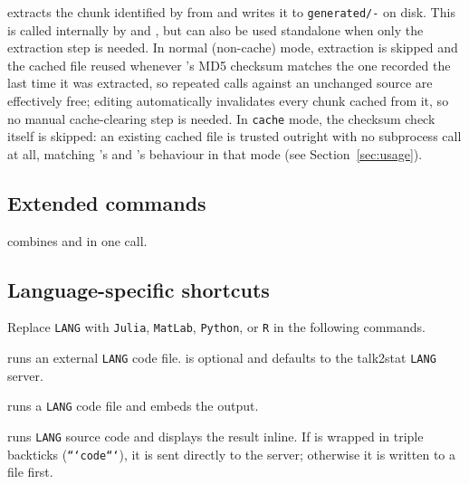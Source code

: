 \documentclass{ltxdoc}
\newcommand{\pkg}[1]{\textsf{#1}}
\newcommand{\opt}[1]{\texttt{#1}}
\newcommand{\file}[1]{\texttt{#1}}
\begin{document}
\DescribeMacro{\writeChunk}
extracts the chunk identified by  from  and writes it
to \file{generated/}\texttt{-} on disk.  This is
called internally by  and , but can also
be used standalone when only the extraction step is needed.
In normal (non-cache) mode, extraction is skipped and the cached file
reused whenever 's MD5 checksum matches the one recorded the
last time it was extracted, so repeated  calls against an
unchanged source are effectively free; editing  automatically
invalidates every chunk cached from it, so no manual cache-clearing step
is needed. In \opt{cache} mode, the checksum check itself is skipped: an
existing cached file is trusted outright with no subprocess call at all,
matching 's and 's behaviour in that mode (see
Section~\ref{sec:usage}).

\subsection{Extended commands}

\DescribeMacro{\runCodeIncOut}
combines  and  in one call.

\subsection{Language-specific shortcuts}

Replace \texttt{LANG} with \texttt{Julia}, \texttt{MatLab},
\texttt{Python}, or \texttt{R} in the following commands.

\DescribeMacro{\runLANG}
runs an external \texttt{LANG} code file.   is optional and
defaults to the \pkg{talk2stat} \texttt{LANG} server.

\DescribeMacro{\runLANGIncOut}
runs a \texttt{LANG} code file and embeds the output.

\DescribeMacro{\inlnLANG}
runs \texttt{LANG} source code and displays the result inline.
If  is wrapped in triple backticks (\texttt{```code```}),
it is sent directly to the server; otherwise it is written to a file
first.
\end{document}
